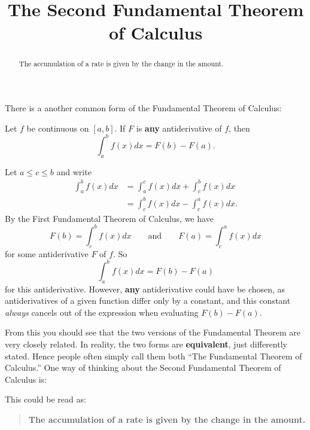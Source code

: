 \documentclass{ximera}
\title[Dig-In:]{The Second Fundamental Theorem of Calculus}
\begin{document}
\begin{abstract}
The accumulation of a rate is given by the change in the amount.
\end{abstract}
\maketitle

There is a another common form of the Fundamental Theorem of Calculus:

\begin{theorem}
  Let $f$ be continuous on $[a,b]$. If $F$ is \textbf{any}
  antiderivative of $f$, then
  \[
  \int_a^b f(x) dx = F(b)-F(a).
  \]
  \begin{explanation}
    Let $a\le c\le b$ and write
    \begin{align*}
      \int_a^b f(x) dx &= \int_a^c f(x) dx + \int_c^b f(x) dx \\
      &= \int_c^b f(x) dx - \int_c^a f(x) dx.
    \end{align*}
    By the First Fundamental Theorem of Calculus, we have
    \[
    F(b) = \int_c^b f(x) dx\qquad\text{and}\qquad F(a) = \int_c^a f(x) dx
    \] 
    for some antiderivative $F$ of $f$. So
    \[
    \int_a^b f(x) dx = F(b)-F(a)
    \]
    for this antiderivative. However, \textbf{any} antiderivative
    could have be chosen, as antiderivatives of a given function
    differ only by a constant, and this constant \textit{always}
    cancels out of the expression when evaluating $F(b)-F(a)$.
\end{explanation}
\end{theorem}

From this you should see that the two versions of the Fundamental
Theorem are very closely related. In reality, the two forms are
\textbf{equivalent}, just differently stated. Hence people often
simply call them both ``The Fundamental Theorem of Calculus.''
One way of thinking about the Second Fundamental Theorem of Calculus is:
\begin{image}
\end{image}
This could be read as:
\begin{quote}\large\textbf{The \textcolor{green!70!black!70!blue}{accumulation} of a \textcolor{blue!70!green}{rate} is given by the \textcolor{purple!50!blue!90!black}{change in the amount}.}
\end{quote}
\end{document}

